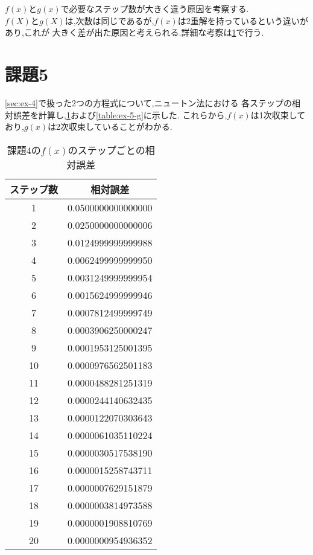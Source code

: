 \documentclass[autodetect-engine, dvi=dvipdfmx, 10pt, a4paper, ja=standard]{bxjsarticle}
\begin{document}
$f(x)とg(x)$で必要なステップ数が大きく違う原因を考察する.
$f(X)とg(X)$は,次数は同じであるが,$f(x)$は2重解を持っているという違いがあり,これが
大きく差が出た原因と考えられる.詳細な考察は\ref{sec:ex-5}で行う.


\section{課題5}
\label{sec:ex-5}

\ref{sec:ex-4}で扱った2つの方程式について,ニュートン法における
各ステップの相対誤差を計算し,\ref{table:ex-5-f}および\ref{table:ex-5-g}に示した.
これらから,$f(x)$は1次収束しており,$g(x)$は2次収束していることがわかる.

\begin{table}[htbp]
	\centering
	\caption{課題4の$f(x)$のステップごとの相対誤差}
	\label{table:ex-5-f}
	\begin{tabular}{@{}cc@{}}
		\toprule
		ステップ数 & 相対誤差               \\ \midrule
		1     & 0.0500000000000000 \\
		2     & 0.0250000000000006 \\
		3     & 0.0124999999999988 \\
		4     & 0.0062499999999950 \\
		5     & 0.0031249999999954 \\
		6     & 0.0015624999999946 \\
		7     & 0.0007812499999749 \\
		8     & 0.0003906250000247 \\
		9     & 0.0001953125001395 \\
		10    & 0.0000976562501183 \\
		11    & 0.0000488281251319 \\
		12    & 0.0000244140632435 \\
		13    & 0.0000122070303643 \\
		14    & 0.0000061035110224 \\
		15    & 0.0000030517538190 \\
		16    & 0.0000015258743711 \\
		17    & 0.0000007629151879 \\
		18    & 0.0000003814973588 \\
		19    & 0.0000001908810769 \\
		20    & 0.0000000954936352 \\ \bottomrule
	\end{tabular}
\end{table}
\end{document}
